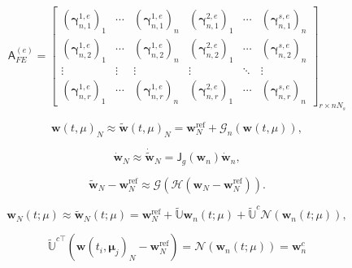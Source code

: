 \documentclass[11pt]{article}
\renewcommand{\vec}[1]{\mathbf{#1}}
\newcommand{\mat}[1]{\mathsf{#1}}
\begin{document}
\begin{equation}
 \mat{A}_{FE}^{(e)} = 
\begin{bmatrix} 
\left(\boldsymbol{\gamma}^{1,e}_{n,1}\right)_1 & \cdots & \left(\boldsymbol{\gamma}^{1,e}_{n,1}\right)_n & \left(\boldsymbol{\gamma}^{2,e}_{n,1}\right)_1 &\cdots &\left(\boldsymbol{\gamma}^{s,e}_{n,1}\right)_n\\ 
\left(\boldsymbol{\gamma}^{1,e}_{n,2}\right)_1 & \cdots & \left(\boldsymbol{\gamma}^{1,e}_{n,2}\right)_n & \left(\boldsymbol{\gamma}^{2,e}_{n,2}\right)_1 &\cdots &\left(\boldsymbol{\gamma}^{s,e}_{n,2}\right)_n\\ 
\vdots & \vdots & \vdots & \vdots &\ddots & \vdots \\ 
\left(\boldsymbol{\gamma}^{1,e}_{n,r}\right)_1 & \cdots & \left(\boldsymbol{\gamma}^{1,e}_{n,r}\right)_n & \left(\boldsymbol{\gamma}^{2,e}_{n,r}\right)_1 &\cdots &\left(\boldsymbol{\gamma}^{s,e}_{n,r}\right)_n
\end{bmatrix}_{r \times n N_s}
\end{equation}

\begin{equation}
    \vec{w}(t,\mu)_N \approx \widetilde{\vec{w}}(t,\mu)_N = \vec{w}^{\text{ref}}_N + \mathscr{G}_n(\vec{w}(t,\mu)),
    \label{eq:NM_ROM_gov}
\end{equation}

\begin{equation}
\dot{\vec{w}}_N \approx \dot{\widetilde{\vec{w}}}_N = \mat{J}_g(\vec{w}_n) \dot{\vec{w}}_n,
\end{equation}

\begin{equation}
    \widetilde{\vec{w}}_N - \vec{w}^{\text{ref}}_N \approx \mathscr{G}(\mathscr{H}(\vec{w}_N - \vec{w}^{\text{ref}}_N)).
\end{equation}

\begin{equation}
  \vec{w}_N(t; \mu) \approx \widetilde{\mathbf{w}}_N(t; \mu) = \mathbf{w}_N^{\text{ref}} +  \widetilde{\mathbb{U}} \vec{w}_n(t; \mu) + \widetilde{\mathbb{U}}^{c} \mathscr{N}(\vec{w}_n(t; \mu)),
  \label{eq:pROM_idea}
\end{equation}

\begin{equation}
\label{eq:ann_prom}
\widetilde{\mathbb{U}}^{c\top} (\vec{w}(t_i,\boldsymbol{\mu}_j)_N-\mathbf{w}_N^{\text{ref}}) = \mathcal{N}(\vec{w}_n(t; \mu)) = \vec{w}^c_n
\end{equation}
\end{document}
